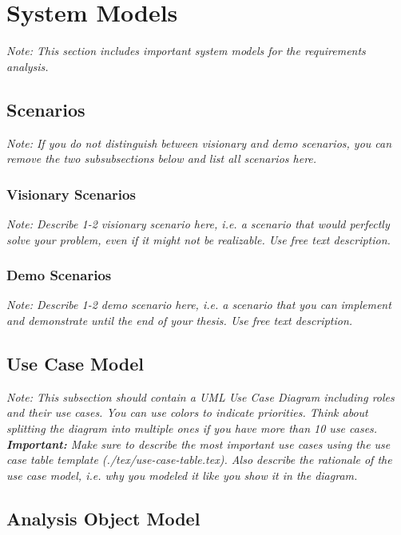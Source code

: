 \documentclass[a4paper,12pt,twoside]{report}
\begin{document}
\section{System Models}

\textit{Note: This section includes important system models for the requirements analysis.}

\subsection{Scenarios}

\textit{Note: If you do not distinguish between visionary and demo scenarios, you can remove the two subsubsections below and list all scenarios here.}

\subsubsection{Visionary Scenarios}

\textit{Note: Describe 1-2 visionary scenario here, i.e. a scenario that would perfectly solve your problem, even if it might not be realizable. Use free text description.}

\subsubsection{Demo Scenarios}

\textit{Note: Describe 1-2 demo scenario here, i.e. a scenario that you can implement and demonstrate until the end of your thesis. Use free text description.}

\subsection{Use Case Model}

\textit{Note: This subsection should contain a UML Use Case Diagram including roles and their use cases. You can use colors to indicate priorities. Think about splitting the diagram into multiple ones if you have more than 10 use cases.
	\textbf{Important:} Make sure to describe the most important use cases using the use case table template (./tex/use-case-table.tex). Also describe the rationale of the use case model, i.e. why you modeled it like you show it in the diagram.}

\subsection{Analysis Object Model}
\end{document}
